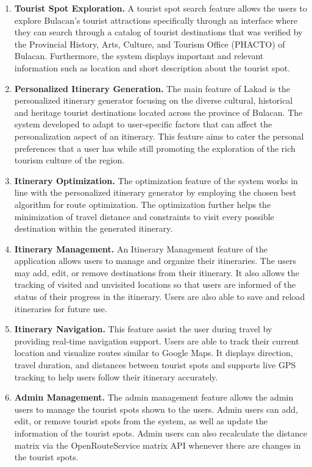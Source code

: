\begin{enumerate}
	\item \textbf{Tourist Spot Exploration.}
		A tourist spot search feature allows the users to explore Bulacan’s tourist attractions specifically through an interface where they can search through a catalog of  tourist destinations that was verified by the Provincial History, Arts, Culture, and Tourism Office (PHACTO) of Bulacan. Furthermore, the system displays important and relevant information such as location and short description about the tourist spot.

	\item \textbf{Personalized Itinerary Generation.}
		The main feature of Lakad is the personalized itinerary generator focusing on the diverse cultural, historical and heritage tourist destinations located across the province of Bulacan. The system developed to adapt to user-specific factors that can affect the personalization aspect of an itinerary. This feature aims to cater the personal preferences that a user has while still promoting the exploration of the rich tourism culture of the region.

	\item \textbf{Itinerary Optimization.}
		The optimization feature of the system works in line with the personalized itinerary generator by employing the chosen best algorithm for route optimization. The optimization further helps the minimization of travel distance and constraints to visit every possible destination within the generated itinerary.

	\item \textbf{Itinerary Management.}
		An Itinerary Management feature of the application allows users to manage and organize their itineraries. The users may add, edit, or remove destinations from their itinerary. It also allows the tracking of visited and unvisited locations so that users are informed of the status of their progress in the itinerary. Users are also able to save and reload itineraries for future use.

	\item \textbf{Itinerary Navigation.}
		This feature assist the user during travel by providing real-time navigation support. Users are able to track their current location and visualize routes similar to Google Maps. It displays direction, travel duration, and distances between tourist spots and supports live GPS tracking to help users follow their itinerary accurately.

	\item \textbf{Admin Management.}
		The admin management feature allows the admin users to manage the tourist spots shown to the users. Admin users can add, edit, or remove tourist spots from the system, as well as update the information of the tourist spots. Admin users can also recalculate the distance matrix via the OpenRouteService matrix API whenever there are changes in the tourist spots.
\end{enumerate}

